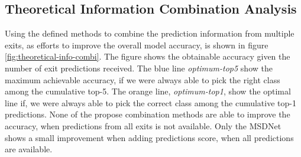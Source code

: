 \subsection{Theoretical Information Combination Analysis}

Using the defined methods to combine the prediction information from multiple exits, as efforts to improve the overall model accuracy, is shown in figure \ref{fig:theoretical-info-combi}. The figure shows the obtainable accuracy given the number of exit predictions received. The blue line \textit{optimum-top5} show the maximum achievable accuracy, if we were always able to pick the right class among the cumulative top-5. The orange line, \textit{optimum-top1}, show the optimal line if, we were always able to pick the correct class among the cumulative top-1 predictions. None of the propose combination methods are able to improve the accuracy, when predictions from all exits is not available. Only the MSDNet shows a small improvement when adding predictions score, when all predictions are available.

